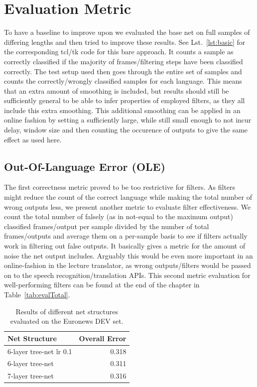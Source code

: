 \section{Evaluation Metric}
\label{sec:eval:bare}

To have a baseline to improve upon we evaluated the base net on full samples of differing lengths and then tried to improve these results. See Lst.~\ref{lst:basic} for the corresponding tcl/tk code for this bare approach. It counts a sample as correctly classified if the majority of frames/filtering steps have been classified correctly. The test setup used then goes through the entire set of samples and counts the correctly/wrongly classified samples for each language. This means that an extra amount of smoothing is included, but results should still be sufficiently general to be able to infer properties of employed filters, as they all include this extra smoothing.  This additional smoothing can be applied in an online fashion by setting a sufficiently large, while still small enough to not incur delay, window size and then counting the occurence of outputs to give the same effect as used here. 

\subsection{Out-Of-Language Error (OLE)}
\label{sec:eval:ole}

The first correctness metric proved to be too restrictive for filters. As filters might reduce the count of the correct language while making the total number of wrong outputs less, we present another metric to evaluate filter effectiveness. We count the total number of falsely (as in not-equal to the maximum output) classified frames/output per sample divided by the number of total frames/outputs and average them on a per-sample basis to see if filters actually work in filtering out false outputs. It basically gives a metric for the amount of noise the net output includes. Arguably this would be even more important in an online-fashion in the lecture translator, as wrong outputs/filters would be passed on to the speech recognition/translation APIs. This second metric evaluation for well-performing filters can be found at the end of the chapter in Table~\ref{tab:evalTotal}.

\begin{table}[h!]
\centering
\caption{Results of different net structures evaluated on the Euronews DEV set.}
\label{tab:evalNS}
\begin{tabular}{| l | r |}
	\hline
	\textbf{Net Structure} & \textbf{Overall Error}  \\
	\hline
	6-layer tree-net lr 0.1 & 0.318 \\
	\hline
	6-layer tree-net  &  0.311 \\
	\hline
	7-layer tree-net & 0.316 \\
	\hline
\end{tabular}
\end{table}

